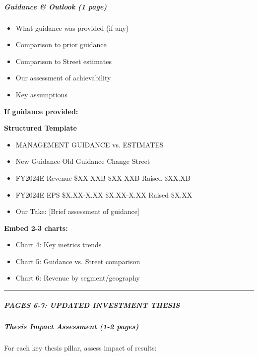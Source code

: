 \documentclass[11pt]{article}
\begin{document}
\subparagraph{Guidance \& Outlook (1 page)}\mbox{}\par
\begin{itemize}[leftmargin=*,itemsep=2pt,topsep=2pt]
\item {} What guidance was provided (if any)
\item {} Comparison to prior guidance
\item {} Comparison to Street estimates
\item {} Our assessment of achievability
\item {} Key assumptions
\end{itemize}

\textbf{If guidance provided:}

\textbf{Structured Template}
\begin{itemize}[leftmargin=*,itemsep=2pt,topsep=2pt]
\item {} MANAGEMENT GUIDANCE vs. ESTIMATES
\item {} New Guidance Old Guidance Change Street
\item {} FY2024E Revenue \$XX-XXB \$XX-XXB Raised \$XX.XB
\item {} FY2024E EPS \$X.XX-X.XX \$X.XX-X.XX Raised \$X.XX
\item {} Our Take: [Brief assessment of guidance]
\end{itemize}

\textbf{Embed 2-3 charts:}

\begin{itemize}[leftmargin=*,itemsep=2pt,topsep=2pt]
\item {} Chart 4: Key metrics trends
\item {} Chart 5: Guidance vs. Street comparison
\item {} Chart 6: Revenue by segment/geography
\end{itemize}

\vspace{0.5em}\hrule\vspace{0.5em}

\subparagraph{PAGES 6-7: UPDATED INVESTMENT THESIS}\mbox{}\par

\subparagraph{Thesis Impact Assessment (1-2 pages)}\mbox{}\par

For each key thesis pillar, assess impact of results:
\end{document}
